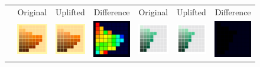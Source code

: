 \begin{figure}[t]
	\centering
	{\sffamily
		\setlength\tabcolsep{0.5pt}
		\begin{tabular}{ccccccc}
			&Original& Uplifted & Difference &\quad Original & Uplifted & Difference
			\vspace{1em} \\ 
			\raisebox{0.4cm}[0pt][0pt]{\parbox[c][0pt][c]{0cm}{\hspace{-1.5em}\\[20pt]}\par}
			&\includegraphics[width=.155\linewidth]{img/results_uplift_page04_originalFL3.png}
			&
			\includegraphics[width=.155\linewidth]{img/results_uplift_page04_sigmoidFL3.png}
			& 
			\includegraphics[width=.155\linewidth]{img/results_uplift_page04_diff_sigmoidFL3.png}
			&\quad
			\includegraphics[width=.155\linewidth]{img/results_uplift_page18_originalD65.png}
			&
			\includegraphics[width=.155\linewidth]{img/results_uplift_page18_sigmoidD65.png}
			&
			\includegraphics[width=.155\linewidth]{img/results_uplift_page18_diff_sigmoidD65.png}

\end{tabular}}
\end{figure}
